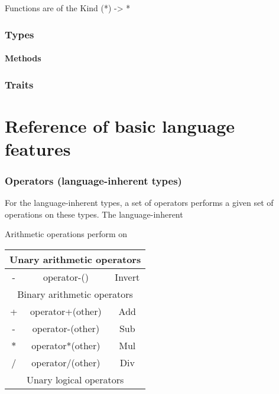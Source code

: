 \documentclass{scrartcl}
\begin{document}
Functions are of the Kind (*) -> *

\section{Types}

\subsection{Methods}

\section{Traits}





\part{Reference of basic language features}

\section{Operators (language-inherent types)}


For the language-inherent types, a set of operators performs a given set of operations on these types. The language-inherent 

Arithmetic operations perform on 

\begin{table}[H]
    \centering
    \begin{tabular}{c|c|c}
    \multicolumn{3}{c}{Unary arithmetic operators} \\ \hline
        - & operator-()         & Invert \\ \hline
    \multicolumn{3}{c}{Binary arithmetic operators} \\ \hline
        + & operator+(other)    & Add \\
        - & operator-(other)    & Sub \\
        $*$ & operator*(other)  & Mul \\
        / & operator/(other)    & Div \\
    \multicolumn{3}{c}{Unary logical operators} \\ \hline
        
    \end{tabular}
\end{table}
\end{document}
